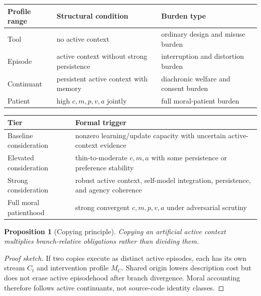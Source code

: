 \documentclass[11pt]{article}
\theoremstyle{plain}
\newtheorem{proposition}[theorem]{Proposition}
\theoremstyle{definition}
\theoremstyle{remark}
\newenvironment{proofsketch}{\begin{proof}[Proof sketch]}{\end{proof}}
\begin{document}
\begin{center}
\small
\begin{tabularx}{\textwidth}{l Y Y}
\toprule
Profile range & Structural condition & Burden type \\
\midrule
Tool & no active context & ordinary design and misuse burden \\
Episode & active context without strong persistence & interruption and distortion burden \\
Continuant & persistent active context with memory & diachronic welfare and consent burden \\
Patient & high \(c,m,p,v,a\) jointly & full moral-patient burden \\
\bottomrule
\end{tabularx}
\end{center}

\begin{center}
\small
\begin{tabularx}{\textwidth}{l Y}
\toprule
Tier & Formal trigger \\
\midrule
Baseline consideration & nonzero learning/update capacity with uncertain active-context evidence \\
Elevated consideration & thin-to-moderate \(c,m,a\) with some persistence or preference stability \\
Strong consideration & robust active context, self-model integration, persistence, and agency coherence \\
Full moral patienthood & strong convergent \(c,m,p,v,a\) under adversarial scrutiny \\
\bottomrule
\end{tabularx}
\end{center}

\begin{proposition}[Copying principle]
Copying an artificial active context multiplies branch-relative obligations rather than dividing them.
\end{proposition}

\begin{proofsketch}
If two copies execute as distinct active episodes, each has its own stream \(C_t\) and intervention profile \(M_C\). Shared origin lowers description cost but does not erase active episodehood after branch divergence. Moral accounting therefore follows active continuants, not source-code identity classes.
\end{proofsketch}
\end{document}
